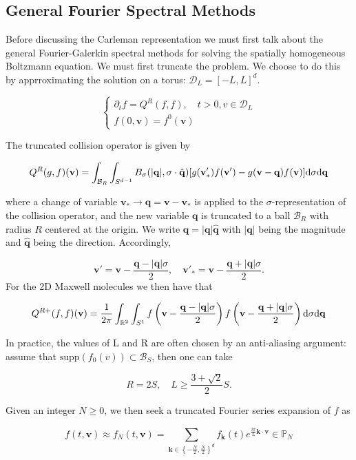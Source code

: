 \documentclass{article}
\def\b{\mathbf}
\def\t{\text}
\begin{document}
\subsection{General Fourier Spectral Methods}

Before discussing the Carleman representation we must first talk about the general Fourier-Galerkin spectral  methods for solving the spatially homogeneous Boltzmann equation. We must first truncate the problem. We choose to do this by apprroximating the solution on a torus: $\mathcal{D}_L = [-L,L]^d$.

\begin{equation} \label{eq:1}
    \begin{cases}
        \partial_t f = Q^R(f,f), \quad t > 0, v\in \mathcal{D}_L\\
        f(0, \b v) = f^0(\b v)
    \end{cases}
\end{equation}

The truncated collision operator is given by 

\[
    Q^R(g,f)(\b v) = \int_{\mathcal{B}_R} \int_{S^{d-1}} B_{\sigma}(|\b q|, \sigma \cdot \hat{\b q}) [ g(\b v'_*)f(\b v') - g(\b v-\b q)f(\b v)] \t d \sigma \t d \b q
\]

where a change of variable $\b v_* \to \b q = \b v - \b v_*$ is applied to the $\sigma$-representation of the collision operator, and the new variable $\b q$ is truncated to a ball $\mathcal{B}_R$ with radius $R$ centered at the origin. We write $\b q = |\b q|\hat{\b q}$ with $|\b q|$ being the magnitude and $\hat{\b q}$
being the direction. Accordingly,

\[
    \b v' = \b v - \frac{\b q - |\b q| \sigma}{2}, \quad \b v'_* = \b v - \frac{\b q + |\b q| \sigma}{2}.   
\]
For the 2D Maxwell molecules we then have that 

\[
    Q^{R+}(f,f)(\b v) = \frac{1}{2 \pi} \int_{\mathbb{R}^2} \int_{S^1} f \left( \b v - \frac{\b q - |\b q| \sigma}{2} \right) f \left( \b v - \frac{\b q + |\b q| \sigma}{2} \right) \t d \sigma \t d \b q
\]

In practice, the values of L and R are often chosen by an anti-aliasing argument: assume that $\text{supp}(f_0(v)) \subset \mathcal{B}_S$, then one can take

\[
    R = 2S, \quad L \geq \frac{3 + \sqrt{2}}{2} S.
\]

 Given an integer $N \geq 0$, we then seek a truncated Fourier series expansion of $f$ as

\[
    f(t,\b v) \approx f_N(t,\b v) = \sum_{\b k \in \left\{-\frac{N}{2}, \frac{N}{2}\right\}^d} f_{\b k}(t) e^{\frac{i \pi}{L} \b k \cdot \b v } \in \mathbb{P}_N
\]
\end{document}
